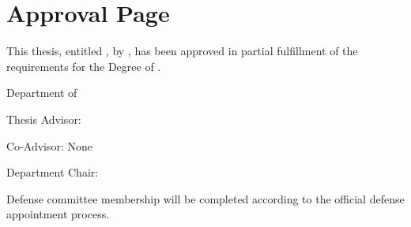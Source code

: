 \chapter*{Approval Page}

This thesis, entitled \textit{\thesistitle}, by \thesisauthor, has been approved in partial fulfillment of the requirements for the Degree of \degreeaward.

\vspace{0.8cm}

\noindent Department of \degreeprogram

\vspace{1.4cm}

\noindent\begin{minipage}{\textwidth}
Thesis Advisor:\hfill\makebox[0.5\textwidth]{\hrulefill}\\
\hspace*{0.5\textwidth}\supervisor

\vspace{1.1cm}

Co-Advisor: None

\vspace{1.1cm}

Department Chair:\hfill\makebox[0.5\textwidth]{\hrulefill}\\
\hspace*{0.5\textwidth}\departmentchair
\end{minipage}

\vspace{1.4cm}

\noindent Defense committee membership will be completed according to the official defense appointment process.
